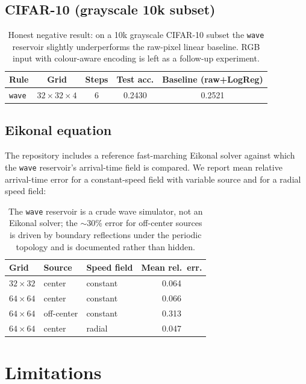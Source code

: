 \documentclass[11pt,a4paper]{article}
\begin{document}
\subsection{CIFAR-10 (grayscale 10k subset)}

\begin{table}[h]
\centering
\begin{tabular}{lcccc}
\toprule
Rule & Grid & Steps & Test acc. & Baseline (raw+LogReg) \\
\midrule
\texttt{wave} & $32{\times}32{\times}4$ & 6 & 0.2430 & 0.2521 \\
\bottomrule
\end{tabular}
\caption{Honest negative result: on a 10k grayscale CIFAR-10 subset the
\texttt{wave} reservoir slightly underperforms the raw-pixel linear baseline.
RGB input with colour-aware encoding is left as a follow-up experiment.}
\label{tab:cifar10}
\end{table}

\subsection{Eikonal equation}

The repository includes a reference fast-marching Eikonal solver against which
the \texttt{wave} reservoir's arrival-time field is compared. We report mean
relative arrival-time error for a constant-speed field with variable source
and for a radial speed field:

\begin{table}[h]
\centering
\begin{tabular}{lllc}
\toprule
Grid & Source & Speed field & Mean rel.\ err. \\
\midrule
$32{\times}32$ & center     & constant & 0.064 \\
$64{\times}64$ & center     & constant & 0.066 \\
$64{\times}64$ & off-center & constant & 0.313 \\
$64{\times}64$ & center     & radial   & 0.047 \\
\bottomrule
\end{tabular}
\caption{The \texttt{wave} reservoir is a crude wave simulator, not an Eikonal
solver; the $\sim$30\% error for off-center sources is driven by boundary
reflections under the periodic topology and is documented rather than hidden.}
\label{tab:eikonal}
\end{table}

\section{Limitations}
\end{document}
